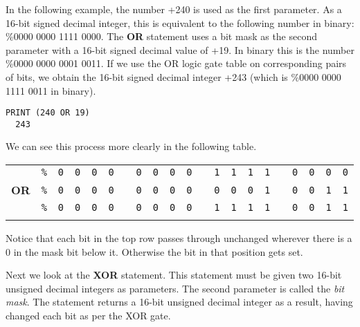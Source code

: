In the following example, the number +240 is used as the first parameter.
As a 16-bit signed decimal integer, this is equivalent to the following
number in binary: \%0000 0000 1111 0000. The {\bf OR} statement uses a
bit mask as the second parameter with a 16-bit signed decimal value of
+19. In binary this is the number \%0000 0000 0001 0011. If we use the
OR logic gate table on corresponding pairs of bits, we obtain the 16-bit
signed decimal integer +243 (which is \%0000 0000 1111 0011 in binary).

\begin{tcolorbox}[colback=black,coltext=white]
\verbatimfont{\codefont}
\begin{verbatim}
PRINT (240 OR 19)
  243
\end{verbatim}
\end{tcolorbox}

We can see this process more clearly in the following table.

\begin{center}
	\begin{tabular}{ccccccccccccccccccccc}
	  & \texttt{\%} & \texttt{0} & \texttt{0} & \texttt{0} & \texttt{0} & & \texttt{0} & \texttt{0} & \texttt{0} & \texttt{0} & & \texttt{1} & \texttt{1} & \texttt{1} & \texttt{1} & & \texttt{0} & \texttt{0} & \texttt{0} & \texttt{0} \\
	  {\bf OR} & \texttt{\%} & \texttt{0} & \texttt{0} & \texttt{0} & \texttt{0} & & \texttt{0} & \texttt{0} & \texttt{0} & \texttt{0} & & \texttt{0} & \texttt{0} & \texttt{0} & \texttt{1} & & \texttt{0} & \texttt{0} & \texttt{1} & \texttt{1} \\ \hline
	  & \texttt{\%} & \texttt{0} & \texttt{0} & \texttt{0} & \texttt{0} & & \texttt{0} & \texttt{0} & \texttt{0} & \texttt{0} & & \texttt{1} & \texttt{1} & \texttt{1} & \texttt{1} & & \texttt{0} & \texttt{0} & \texttt{1} & \texttt{1} \\ \hhline{=====================}
	  \end{tabular}
\end{center}

Notice that each bit in the top row passes through unchanged wherever
there is a 0 in the mask bit below it. Otherwise the bit in that position gets set.

Next we look at the {\bf XOR} statement. This statement must be given
two 16-bit unsigned decimal integers as parameters. The second parameter
is called the {\it bit mask}. The statement returns a 16-bit unsigned
decimal integer as a result, having changed each bit as per the XOR gate.

